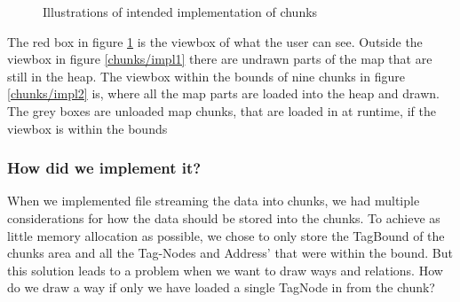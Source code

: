 \begin{figure}[ht]%
  \centering
%
  \caption{Illustrations of intended implementation of chunks}\label{chunks/implement}
\end{figure}
\newpage
The red box in figure \ref{chunks/implement} is the viewbox of what the user can see. Outside the viewbox in figure \ref{chunks/impl1} there are undrawn parts of the map that are still in the heap. The viewbox within the bounds of nine chunks in figure \ref{chunks/impl2} is, where all the map parts are loaded into the heap and drawn. The grey boxes are unloaded map chunks, that are loaded in at runtime, if the viewbox is within the bounds
\subsubsection{How did we implement it?}
When we implemented file streaming the data into chunks, we had multiple considerations for how the data should be stored into the chunks. To achieve as little memory allocation as possible, we chose to only store the TagBound of the chunks area and all the Tag-Nodes and Address’ that were within the bound. 
\newline
But this solution leads to a problem when we want to draw ways and relations. How do we draw a way if only we have loaded a single TagNode in from the chunk?


